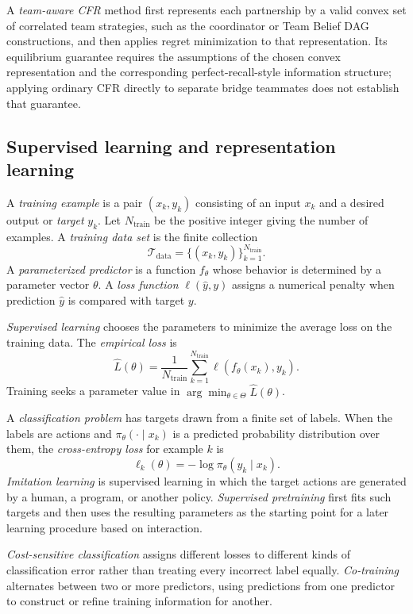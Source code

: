 A \emph{team-aware CFR} method first represents each partnership by a valid convex set of correlated team strategies, such as the coordinator or Team Belief DAG constructions, and then applies regret minimization to that representation. Its equilibrium guarantee requires the assumptions of the chosen convex representation and the corresponding perfect-recall-style information structure; applying ordinary CFR directly to separate bridge teammates does not establish that guarantee.


\subsection{Supervised learning and representation learning}

A \emph{training example} is a pair $(x_k,y_k)$ consisting of an input $x_k$ and a desired output or \emph{target} $y_k$. Let $N_{\mathrm{train}}$ be the positive integer giving the number of examples. A \emph{training data set} is the finite collection
\[
    \mathcal{T}_{\mathrm{data}}=\{(x_k,y_k)\}_{k=1}^{N_{\mathrm{train}}}.
\]
A \emph{parameterized predictor} is a function $f_\theta$ whose behavior is determined by a parameter vector $\theta$. A \emph{loss function} $\ell(\widehat y,y)$ assigns a numerical penalty when prediction $\widehat y$ is compared with target $y$.

\emph{Supervised learning} chooses the parameters to minimize the average loss on the training data. The \emph{empirical loss} is
\[
    \widehat L(\theta)
    =
    \frac{1}{N_{\mathrm{train}}}
    \sum_{k=1}^{N_{\mathrm{train}}}
    \ell(f_\theta(x_k),y_k).
\]
Training seeks a parameter value in $\arg\min_{\theta\in\Theta}\widehat L(\theta)$.

A \emph{classification problem} has targets drawn from a finite set of labels. When the labels are actions and $\pi_\theta(\cdot\mid x_k)$ is a predicted probability distribution over them, the \emph{cross-entropy loss} for example $k$ is
\[
    \ell_k(\theta)
    =
    -\log\pi_\theta(y_k\mid x_k).
\]
\emph{Imitation learning} is supervised learning in which the target actions are generated by a human, a program, or another policy. \emph{Supervised pretraining} first fits such targets and then uses the resulting parameters as the starting point for a later learning procedure based on interaction.

\emph{Cost-sensitive classification} assigns different losses to different kinds of classification error rather than treating every incorrect label equally. \emph{Co-training} alternates between two or more predictors, using predictions from one predictor to construct or refine training information for another.

